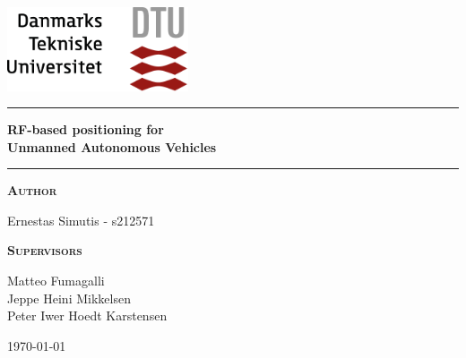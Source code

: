 
\begin{titlepage}
\begin{center}
\vspace{2cm}
\includegraphics[width=0.4\textwidth]{root/dtu.png}~\\[1cm]
\vspace{2cm}

\vspace{2cm}

\hrule
\vspace{.5cm}
{ \huge \bfseries RF-based positioning for\\ }
\vspace{.1cm}
{ \huge \bfseries Unmanned Autonomous Vehicles}
\vspace{.5cm}

\hrule
\vspace{1.5cm}

\textsc{\textbf{Author}}\\
\vspace{.5cm}
\centering

Ernestas Simutis - s212571\\
\vspace{.5cm}

\textsc{\textbf{Supervisors}}\\
\vspace{.5cm}
\centering

Matteo Fumagalli\\
Jeppe Heini Mikkelsen\\
Peter Iwer Hoedt Karstensen\\

\vspace*{\fill}

\centering \today
\end{center}
\end{titlepage}

